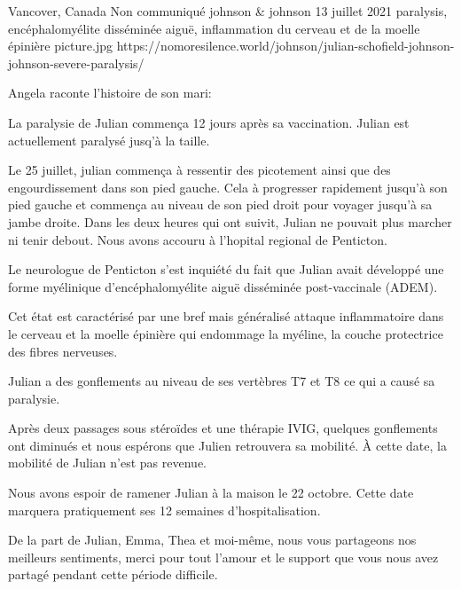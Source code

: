 {Vancover, Canada}
{Non communiqué}
{johnson \& johnson}
{13 juillet 2021}
{paralysis, encéphalomyélite disséminée aiguë, inflammation du cerveau et de la moelle épinière}
{picture.jpg}
{https://nomoresilence.world/johnson/julian-schofield-johnson-johnson-severe-paralysis/}
{

Angela raconte l'histoire de son mari:

La paralysie de Julian commença 12 jours après sa vaccination. Julian est
actuellement paralysé jusq'à la taille.

Le 25 juillet, julian commença à ressentir des picotement ainsi que des
engourdissement dans son pied gauche. Cela à progresser rapidement jusqu'à son
pied gauche et commença au niveau de son pied droit pour voyager jusqu'à sa
jambe droite. Dans les deux heures qui ont suivit, Julian ne pouvait plus
marcher ni tenir debout. Nous avons accouru à l'hopital regional de Penticton.

Le neurologue de Penticton s'est inquiété du fait que Julian avait développé une
forme myélinique d'encéphalomyélite aiguë disséminée post-vaccinale (ADEM).

Cet état est caractérisé par une bref mais généralisé attaque inflammatoire dans
le cerveau et la moelle épinière qui endommage la myéline, la couche protectrice
des fibres nerveuses.

Julian a des gonflements au niveau de ses vertèbres T7 et T8 ce qui a causé sa
paralysie.

Après deux passages sous stéroïdes et une thérapie IVIG, quelques gonflements
ont diminués et nous espérons que Julien retrouvera sa mobilité. À cette date,
la mobilité de Julian n'est pas revenue.

Nous avons espoir de ramener Julian à la maison le 22 octobre. Cette date
marquera pratiquement ses 12 semaines d'hospitalisation.

De la part de Julian, Emma, Thea et moi-même, nous vous partageons nos meilleurs
sentiments, merci pour tout l'amour et le support que vous nous avez partagé
pendant cette période difficile.

}

